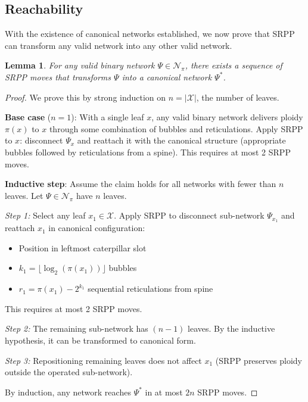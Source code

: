 \documentclass{article}
\newtheorem{lemma}[theorem]{Lemma}
\begin{document}
\subsection{Reachability}

With the existence of canonical networks established, we now prove that SRPP can transform any valid network into any other valid network.

\begin{lemma}\label{lem:to-canonical}
For any valid binary network $\Psi \in \mathcal{N}_\pi$, there exists a sequence of SRPP moves that transforms $\Psi$ into a canonical network $\Psi^*$.
\end{lemma}

\begin{proof}
We prove this by strong induction on $n = |\mathcal{X}|$, the number of leaves.

\textbf{Base case} ($n = 1$): With a single leaf $x$, any valid binary network delivers ploidy $\pi(x)$ to $x$ through some combination of bubbles and reticulations. Apply SRPP to $x$: disconnect $\Psi_x$ and reattach it with the canonical structure (appropriate bubbles followed by reticulations from a spine). This requires at most 2 SRPP moves.

\textbf{Inductive step}: Assume the claim holds for all networks with fewer than $n$ leaves. Let $\Psi \in \mathcal{N}_\pi$ have $n$ leaves.

\textit{Step 1:} Select any leaf $x_1 \in \mathcal{X}$. Apply SRPP to disconnect sub-network $\Psi_{x_1}$ and reattach $x_1$ in canonical configuration:
\begin{itemize}
    \item Position in leftmost caterpillar slot
    \item $k_1 = \lfloor \log_2(\pi(x_1)) \rfloor$ bubbles
    \item $r_1 = \pi(x_1) - 2^{k_1}$ sequential reticulations from spine
\end{itemize}
This requires at most 2 SRPP moves.

\textit{Step 2:} The remaining sub-network has $(n-1)$ leaves. By the inductive hypothesis, it can be transformed to canonical form.

\textit{Step 3:} Repositioning remaining leaves does not affect $x_1$ (SRPP preserves ploidy outside the operated sub-network).

By induction, any network reaches $\Psi^*$ in at most $2n$ SRPP moves.
\end{proof}
\end{document}
